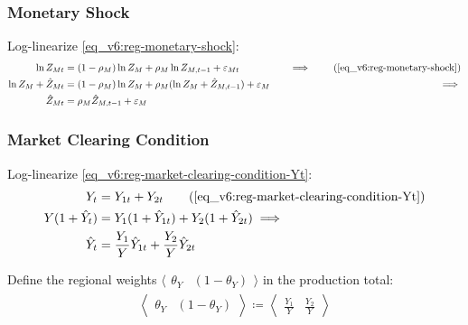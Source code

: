 \documentclass[../thesis.tex]{subfiles}
\begin{document}

\subsubsection*{Monetary Shock}

Log-linearize \ref{eq_v6:reg-monetary-shock}:
\begin{alignat}{2}
	\ln{Z_{Mt}} &= (1-\rho_M)\ln{Z_M} + \rho_M\ln{Z_{M,t-1}} + \varepsilon_{Mt} &\implies \tag{\ref{eq_v6:reg-monetary-shock}} \\
	\ln{Z_{M}} + \hat{Z}_{Mt} &= (1-\rho_M) \ln{Z_M} + \rho_M (\ln{Z_{M}} + \hat{Z}_{M,t-1}) + \varepsilon_{M} \quad &\implies \nonumber \\
	\hat{Z}_{Mt} &= \rho_M \hat{Z}_{M,t-1} + \varepsilon_{M} \label{eq_v6:reg-ll-monetary-shock}
\end{alignat}




\subsubsection*{Market Clearing Condition}

Log-linearize \ref{eq_v6:reg-market-clearing-condition-Yt}:
\begin{alignat}{2}
	Y_{t} &= Y_{1 t} + Y_{2 t} \tag{\ref{eq_v6:reg-market-clearing-condition-Yt}} \\
	Y (1 +\hat{Y}_{t}) &= Y_{1} (1 +\hat{Y}_{1t}) + Y_{2} (1 +\hat{Y}_{2t}) \implies \nonumber \\
	\hat{Y}_{t} &= \frac{Y_{1}}{Y} \hat{Y}_{1t} + \frac{Y_{2}}{Y} \hat{Y}_{2t} \label{eq_v6:reg-ll-market-clearing-condition-Yt-2}
\end{alignat}


Define the regional weights $\langle \begin{matrix} \theta_{Y} & (1-\theta_{Y}) \end{matrix} \rangle$ in the production total:
\begin{align}
	\left\langle \begin{matrix} \theta_{Y} & (1-\theta_{Y}) \end{matrix} \right\rangle \coloneq \left\langle \begin{matrix} \frac{Y_{1}}{Y} & \frac{Y_{2}}{Y} \end{matrix} \right\rangle \label{eq_v6:reg-ss-Y1-Y2-weight-in-Y}
\end{align}
\end{document}
